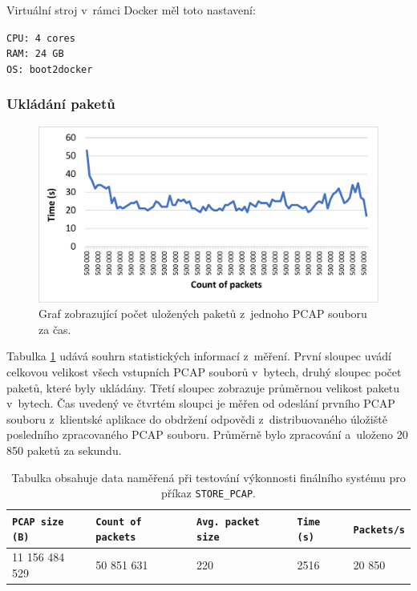 \vspace{0.5cm}
\noindent Virtuální stroj v~rámci Docker měl toto nastavení:

\vspace{0.5cm}
\noindent \texttt{CPU: 4 cores} \\
\texttt{RAM: 24 GB} \\
\texttt{OS: boot2docker}

\subsubsection{Ukládání paketů}

\begin{figure}[!h]
    \centering
    \includegraphics[width=15cm]{template-fig/PerformanceChartFinalBigData.pdf}
    \caption{Graf zobrazující počet uložených paketů z~jednoho PCAP souboru za čas.}
    \label{FIG_PerformanceChartFinalBigData}
\end{figure}

\noindent Tabulka \ref{tablePerformanceFinalSystemBigData} udává souhrn statistických informací z~měření. První sloupec uvádí celkovou velikost všech vstupních PCAP souborů v~bytech, druhý sloupec počet paketů, které byly ukládány. Třetí sloupec zobrazuje průměrnou velikost paketu v~bytech. Čas uvedený ve čtvrtém sloupci je měřen od odeslání prvního PCAP souboru z~klientské aplikace do obdržení odpovědi z~distribuovaného úložiště posledního zpracovaného PCAP souboru. Průměrně bylo zpracování a~uloženo 20 850 paketů za sekundu.

\begin{table}[h!]
    \centering
    \begin{tabular}{| l | l | l | l | l |}
    \hline
    \texttt{PCAP size (B)}   &   \texttt{Count of packets}   &   \texttt{Avg. packet size} &  \texttt{Time (s)} &   \texttt{Packets/s} \\ \hline
    11 156 484 529 & 50 851 631 & 220 & 2516 & 20 850 \\ \hline
    \end{tabular}\par
    \bigskip
    \caption{Tabulka obsahuje data naměřená při testování výkonnosti finálního systému pro příkaz \texttt{STORE\_PCAP}.}
    \label{tablePerformanceFinalSystemBigData}
\end{table}

